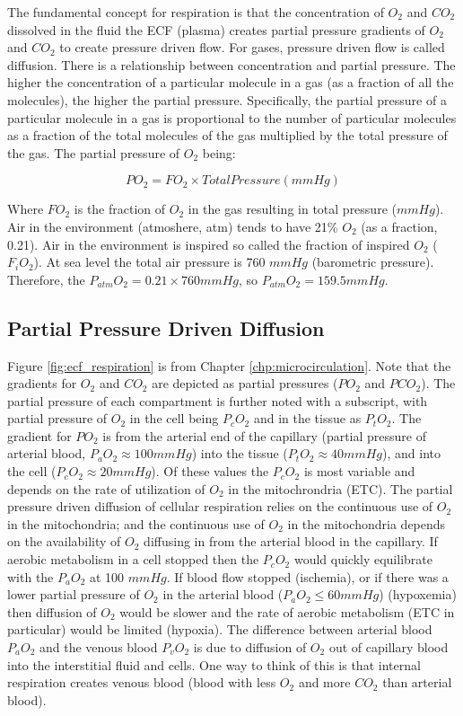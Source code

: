 The fundamental concept for respiration is that the concentration of $O_2$ and $CO_2$ dissolved in the fluid the ECF (plasma) creates partial pressure gradients of $O_2$ and $CO_2$ to create pressure driven flow. For gases, pressure driven flow is called diffusion. There is a relationship between concentration and partial pressure. The higher the concentration of a particular molecule in a gas (as a fraction of all the molecules), the higher the partial pressure. Specifically, the partial pressure of a particular molecule in a gas is proportional to the number of particular molecules as a fraction of the total molecules of the gas multiplied by the total pressure of the gas. The partial pressure of $O_2$ being:

\begin{equation}
    PO_2 = FO_2 \times Total Pressure (mmHg)
    \label{PO2}
\end{equation}

Where $FO_2$ is the fraction of $O_2$ in the gas resulting in total pressure ($mmHg$). Air in the environment (atmoshere, atm) tends to have 21\% $O_2$ (as a fraction, 0.21). Air in the environment is inspired so called the fraction of inspired $O_2$ ($F_iO_2$). At sea level the total air pressure is 760 $mmHg$ (barometric pressure). Therefore, the $P_{atm}O_2 = 0.21 \times 760 mmHg$, so $P_{atm}O_2 = 159.5 mmHg$. 

\subsection{Partial Pressure Driven Diffusion}

Figure \ref{fig:ecf_respiration} is from Chapter \ref{chp:microcirculation}. Note that the gradients for $O_2$ and $CO_2$ are depicted as partial pressures ($PO_2$ and $PCO_2$). The partial pressure of each compartment is further noted with a subscript, with partial pressure of $O_2$ in the cell being $P_cO_2$ and in the tissue as $P_tO_2$. The gradient for $PO_2$ is from the arterial end of the capillary (partial pressure of arterial blood, $P_aO_2 \approx 100 mmHg$) into the tissue ($P_tO_2 \approx 40 mmHg$), and into the cell ($P_cO_2 \approx 20 mmHg$). Of these values the $P_cO_2$ is most variable and depends on the rate of utilization of $O_2$ in the mitochrondria (ETC). The partial pressure driven diffusion of cellular respiration relies on the continuous use of $O_2$ in the mitochondria; and the continuous use of $O_2$ in the mitochondria depends on the availability of $O_2$ diffusing in from the arterial blood in the capillary. If aerobic metabolism in a cell stopped then the $P_cO_2$ would quickly equilibrate with the $P_aO_2$ at 100 $mmHg$. If blood flow stopped (ischemia), or if there was a lower partial pressure of $O_2$ in the arterial blood ($P_aO_2 \leq 60 mmHg$) (hypoxemia) then diffusion of $O_2$ would be slower and the rate of aerobic metabolism (ETC in particular) would be limited (hypoxia). 
The difference between arterial blood $P_aO_2$ and the venous blood $P_vO_2$ is due to diffusion of $O_2$ out of capillary blood into the interstitial fluid and cells. One way to think of this is that internal respiration creates venous blood (blood with less $O_2$ and more $CO_2$ than arterial blood). 

